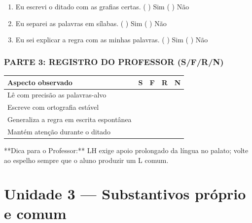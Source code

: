 \begin{exercicio}
\begin{enumerate}[label=\alph*)]
  \item Eu escrevi o ditado com as grafias certas.  \quad ( ) Sim   ( ) Não

  \item Eu separei as palavras em sílabas.  \quad ( ) Sim   ( ) Não

  \item Eu sei explicar a regra com as minhas palavras.  \quad ( ) Sim   ( ) Não

\end{enumerate}

\subsection*{PARTE 3: REGISTRO DO PROFESSOR (S/F/R/N)}

\begin{center}
\renewcommand{\arraystretch}{1.4}
\begin{tabular}{@{}p{9cm}cccc@{}}
\toprule
Aspecto observado & S & F & R & N \\
\midrule
Lê com precisão as palavras-alvo & & & & \\
Escreve com ortografia estável & & & & \\
Generaliza a regra em escrita espontânea & & & & \\
Mantém atenção durante o ditado & & & & \\
\bottomrule\end{tabular}\end{center}

\end{exercicio}

\begin{dica}
**Dica para o Professor:** LH exige apoio prolongado da língua no palato; volte ao espelho sempre que o aluno produzir um L comum.
\end{dica}


\chapter{Unidade 3 --- Substantivos próprio e comum}


